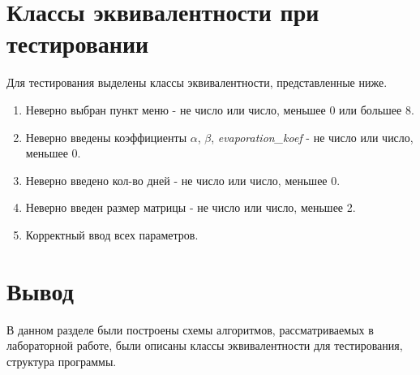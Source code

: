 \clearpage


\section{Классы эквивалентности при тестировании}

Для тестирования выделены классы эквивалентности, представленные ниже.

\begin{enumerate}
	\item Неверно выбран пункт меню - не число или число, меньшее 0 или большее 8.
	\item Неверно введены коэффициенты $\alpha$, $\beta$, \textit{evaporation\_koef} - не число или число, меньшее 0.
	\item Неверно введено кол-во дней - не число или число, меньшее 0.
	\item Неверно введен размер матрицы - не число или число, меньшее 2.
	\item Корректный ввод всех параметров.
\end{enumerate}


\section{Вывод}

В данном разделе были построены схемы алгоритмов, рассматриваемых в лабораторной работе, были описаны классы эквивалентности для тестирования, структура программы.
